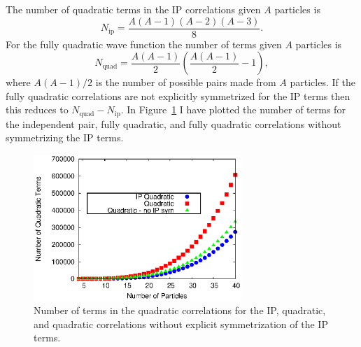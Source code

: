 The number of quadratic terms in the IP correlations given $A$ particles is
\begin{equation}
   N_\text{ip}=\frac{A(A-1)(A-2)(A-3)}{8}.
\end{equation}
For the fully quadratic wave function the number of terms given $A$ particles is
\begin{equation}
   N_\text{quad}=\frac{A(A-1)}{2}\left(\frac{A(A-1)}{2}-1\right),
\end{equation}
where $A(A-1)/2$ is the number of possible pairs made from $A$ particles. If the fully quadratic correlations are not explicitly symmetrized for the IP terms then this reduces to $N_\text{quad}-N_\text{ip}$. In Figure~\ref{fig:scaling_theory} I have plotted the number of terms for the independent pair, fully quadratic, and fully quadratic correlations without symmetrizing the IP terms.
\begin{figure}[h!]
   \centering
   \includegraphics[width=0.7\textwidth]{figures/scaling_theory.eps}
   \caption{Number of terms in the quadratic correlations for the IP, quadratic, and quadratic correlations without explicit symmetrization of the IP terms.}
   \label{fig:scaling_theory}
\end{figure}

